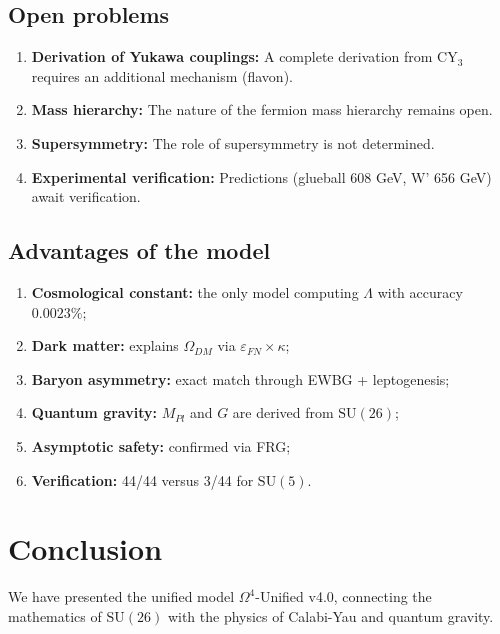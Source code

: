 \documentclass[12pt,a4paper,twoside]{article}
\newcommand{\SU}{\mathrm{SU}}
\newcommand{\EPS}{\varepsilon}
\theoremstyle{definition}
\begin{document}
\subsection{Open problems}

\begin{enumerate}
    \item \textbf{Derivation of Yukawa couplings:} A complete derivation from CY$_3$ requires an additional mechanism (flavon).
    \item \textbf{Mass hierarchy:} The nature of the fermion mass hierarchy remains open.
    \item \textbf{Supersymmetry:} The role of supersymmetry is not determined.
    \item \textbf{Experimental verification:} Predictions (glueball 608 GeV, W' 656 GeV) await verification.
\end{enumerate}

\subsection{Advantages of the model}

\begin{enumerate}
    \item \textbf{Cosmological constant:} the only model computing $\Lambda$ with accuracy $0.0023\%$;
    \item \textbf{Dark matter:} explains $\Omega_{DM}$ via $\EPS_{FN} \times \kappa$;
    \item \textbf{Baryon asymmetry:} exact match through EWBG + leptogenesis;
    \item \textbf{Quantum gravity:} $M_{Pl}$ and $G$ are derived from $\SU(26)$;
    \item \textbf{Asymptotic safety:} confirmed via FRG;
    \item \textbf{Verification:} 44/44 versus 3/44 for $\SU(5)$.
\end{enumerate}

\section{Conclusion}
\label{sec:conclusion}

We have presented the unified model $\Omega^4$-Unified v4.0, connecting the mathematics of $\SU(26)$ with the physics of Calabi-Yau and quantum gravity.
\end{document}
